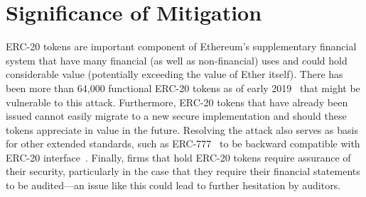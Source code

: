 \section{Significance of Mitigation}
ERC-20 tokens are important component of Ethereum's supplementary financial system that have many financial (as well as non-financial) uses and could hold considerable value (potentially exceeding the value of Ether itself). There has been more than 64,000 functional ERC-20 tokens as of early 2019~\cite{victormeasuring} that might be vulnerable to this attack. Furthermore, ERC-20 tokens that have already been issued cannot easily migrate to a new secure implementation and should these tokens appreciate in value in the future. Resolving the attack also serves as basis for other extended standards, such as ERC-777~\cite{EIP777} to be backward compatible with ERC-20 interface~\cite{frowis2018detecting}. Finally, firms that hold ERC-20 tokens require assurance of their security, particularly in the case that they require their financial statements to be audited---an issue like this could lead to further hesitation by auditors.

